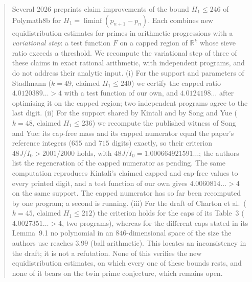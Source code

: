 

\begin{abstract}
Several 2026 preprints claim improvements of the bound $H_1\le246$ of
Polymath8b for $H_1=\liminf(p_{n+1}-p_n)$. Each combines new equidistribution
estimates for primes in arithmetic progressions with a \emph{variational step}:
a test function $F$ on a capped region of $\mathbb R^k$ whose sieve ratio
exceeds a threshold. We recompute the variational step of three of these
claims in exact rational arithmetic, with independent programs, and do not
address their analytic input. (i) For the support and parameters of Stadlmann
($k=49$, claimed $H_1\le240$) we certify the capped ratio $4.0120389\ldots>4$
with a test function of our own, and $4.0124198\ldots$ after optimising it on
the capped region; two independent programs agree to the last digit.
(ii) For the support shared by Kintali and by Song and Yue ($k=48$, claimed
$H_1\le236$) we recompute the published witness of Song and Yue: its cap-free
mass and its capped numerator equal the paper's reference integers ($655$ and
$715$ digits) exactly, so their criterion $48J/I_0>2001/2000$ holds, with
$48J/I_0=1.000664921591\ldots$; the authors list the regeneration of the
capped numerator as pending. The same computation reproduces Kintali's
claimed capped and cap-free values to every printed digit, and a test
function of our own gives $4.0060814\ldots>4$ on the same support. The capped
numerator has so far been recomputed by one program; a second is running.
(iii) For the draft of Charton et al.\ ($k=45$, claimed $H_1\le212$) the
criterion holds for the caps of its Table~3 ($4.0027351\ldots>4$, two
programs), whereas for the different caps stated in its Lemma~9.1 no
polynomial in an $846$-dimensional space of the size the authors use reaches
$3.99$ (ball arithmetic). This locates an inconsistency in the draft; it is
not a refutation. None of this verifies the new equidistribution estimates,
on which every one of these bounds rests, and none of it bears on the twin
prime conjecture, which remains open.
\end{abstract}

\maketitle


